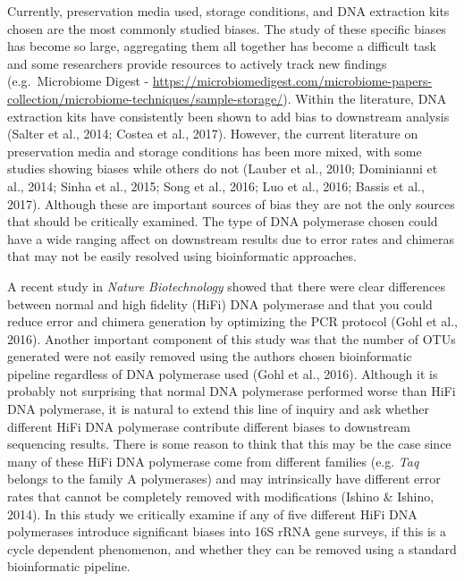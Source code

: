 \documentclass[12pt,]{article}
\begin{document}
Currently, preservation media used, storage conditions, and DNA
extraction kits chosen are the most commonly studied biases. The study
of these specific biases has become so large, aggregating them all
together has become a difficult task and some researchers provide
resources to actively track new findings (e.g.~Microbiome Digest -
\url{https://microbiomedigest.com/microbiome-papers-collection/microbiome-techniques/sample-storage/}).
Within the literature, DNA extraction kits have consistently been shown
to add bias to downstream analysis (Salter et al., 2014; Costea et al.,
2017). However, the current literature on preservation media and storage
conditions has been more mixed, with some studies showing biases while
others do not (Lauber et al., 2010; Dominianni et al., 2014; Sinha et
al., 2015; Song et al., 2016; Luo et al., 2016; Bassis et al., 2017).
Although these are important sources of bias they are not the only
sources that should be critically examined. The type of DNA polymerase
chosen could have a wide ranging affect on downstream results due to
error rates and chimeras that may not be easily resolved using
bioinformatic approaches.

A recent study in \emph{Nature Biotechnology} showed that there were
clear differences between normal and high fidelity (HiFi) DNA polymerase
and that you could reduce error and chimera generation by optimizing the
PCR protocol (Gohl et al., 2016). Another important component of this
study was that the number of OTUs generated were not easily removed
using the authors chosen bioinformatic pipeline regardless of DNA
polymerase used (Gohl et al., 2016). Although it is probably not
surprising that normal DNA polymerase performed worse than HiFi DNA
polymerase, it is natural to extend this line of inquiry and ask whether
different HiFi DNA polymerase contribute different biases to downstream
sequencing results. There is some reason to think that this may be the
case since many of these HiFi DNA polymerase come from different
families (e.g. \emph{Taq} belongs to the family A polymerases) and may
intrinsically have different error rates that cannot be completely
removed with modifications (Ishino \& Ishino, 2014). In this study we
critically examine if any of five different HiFi DNA polymerases
introduce significant biases into 16S rRNA gene surveys, if this is a
cycle dependent phenomenon, and whether they can be removed using a
standard bioinformatic pipeline.
\end{document}
